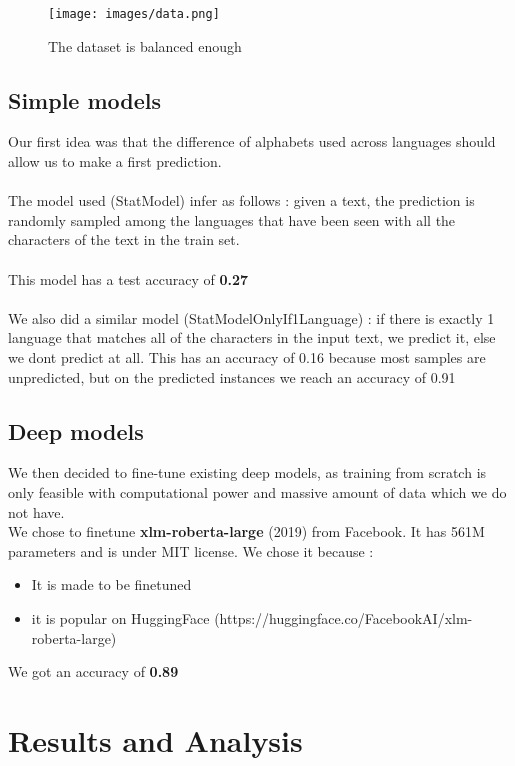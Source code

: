 \documentclass[11pt]{article}
\begin{document}
\begin{figure}[h]
    \centering
    \texttt{[image: images/data.png]}  %
    \caption{The dataset is balanced enough}
    \label{fig:data}
\end{figure}

\subsection{Simple models}
Our first idea was that the difference of alphabets used across languages should allow us to make a first prediction.
\\
\\
The model used (StatModel) infer as follows :
given a text, the prediction is randomly sampled among the languages that have been seen with all the characters of the text in the train set.
\\\\
This model has a test accuracy of \textbf{0.27}
\\\\
We also did a similar model (StatModelOnlyIf1Language) : if there is exactly 1 language that matches all of the characters in the input text, we predict it, else we dont predict at all. This has an accuracy of 0.16 because most samples are unpredicted, but on the predicted instances we reach an accuracy of 0.91

\subsection{Deep models}
We then decided to fine-tune existing deep models, as training from scratch is only feasible with computational power and massive amount of data which we do not have.
\\
We chose to finetune \textbf{xlm-roberta-large} (2019) from Facebook. It has 561M parameters and is under MIT license. We chose it because :
\begin{itemize}[noitemsep, topsep=0pt]
    \item It is made to be finetuned
    \item it is popular on HuggingFace (https://huggingface.co/FacebookAI/xlm-roberta-large)
\end{itemize}

We got an accuracy of \textbf{0.89}

\section{Results and Analysis}
\end{document}
